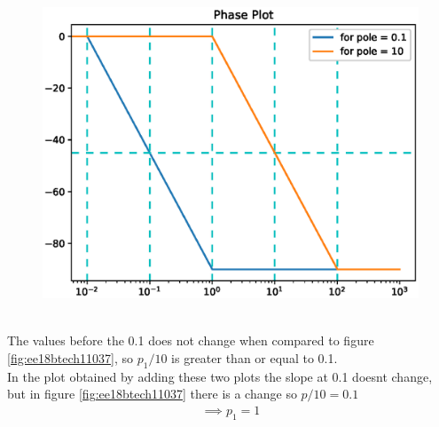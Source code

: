 \begin{enumerate}[label=\thesubsection.\arabic*.,ref=\thesubsection.\theenumi]
\begin{figure}[!ht]
\includegraphics[width=\columnwidth]{figs/ee18btech11037/ee18btech11037_2.eps}
\caption{}
\label{fig:ee18btech11037_2}
\end{figure}
\\
The values before the 0.1 does not change when compared to figure \ref{fig:ee18btech11037}, so $p_1/10$ is greater than or equal to 0.1.
\\
In the plot obtained by adding these two plots the slope at 0.1 doesnt change, but in figure \ref{fig:ee18btech11037} there is a change so $p/10 = 0.1 $ 
\begin{align}
\implies p_1 = 1
\end{align}


\end{enumerate}
